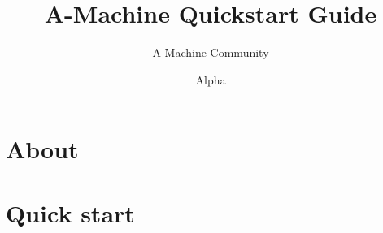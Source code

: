 \documentclass[11pt]{book}
\title{A-Machine Quickstart Guide}
\author{A-Machine Community}
\date{Alpha}
\begin{document}
\maketitle
\def\title#1{\chapter{#1}}
\tableofcontents

\part{About}
        
        
\part{Quick start}
        
        
        
        
        
        
        
        
\end{document}

